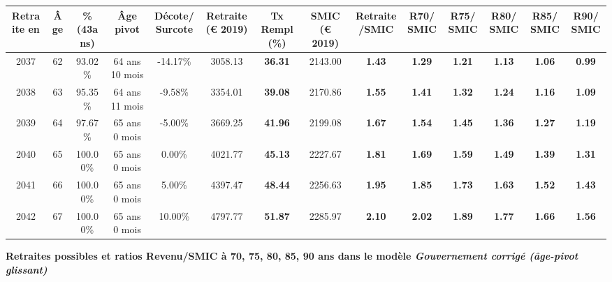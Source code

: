 \begin{adjustbox}{max width=\textwidth} 
\begin{tabular}[htb]{|c|c||c|c|c||c|c||c|c||c|c|c|c|c|} 
\hline 
 Retraite en &  Âge &  \%(43ans) &  Âge pivot &  Décote/Surcote &  Retraite (\euro{} 2019) &  Tx Rempl(\%) &  SMIC (\euro{} 2019) &  Retraite/SMIC &  R70/SMIC &  R75/SMIC &  R80/SMIC &  R85/SMIC &  R90/SMIC \\ 
\hline \hline 
 2037 &  62 &  93.02\% &  64 ans 10 mois &  -14.17\% &  3058.13 &  {\bf 36.31} &  2143.00 &  {\bf 1.43} &  {\bf 1.29} &  {\bf 1.21} &  {\bf 1.13} &  {\bf 1.06} &  {\bf {\color{red} 0.99}} \\ 
\hline 
 2038 &  63 &  95.35\% &  64 ans 11 mois &  -9.58\% &  3354.01 &  {\bf 39.08} &  2170.86 &  {\bf 1.55} &  {\bf 1.41} &  {\bf 1.32} &  {\bf 1.24} &  {\bf 1.16} &  {\bf 1.09} \\ 
\hline 
 2039 &  64 &  97.67\% &  65 ans 0 mois &  -5.00\% &  3669.25 &  {\bf 41.96} &  2199.08 &  {\bf 1.67} &  {\bf 1.54} &  {\bf 1.45} &  {\bf 1.36} &  {\bf 1.27} &  {\bf 1.19} \\ 
\hline 
 2040 &  65 &  100.00\% &  65 ans 0 mois &  0.00\% &  4021.77 &  {\bf 45.13} &  2227.67 &  {\bf 1.81} &  {\bf 1.69} &  {\bf 1.59} &  {\bf 1.49} &  {\bf 1.39} &  {\bf 1.31} \\ 
\hline 
 2041 &  66 &  100.00\% &  65 ans 0 mois &  5.00\% &  4397.47 &  {\bf 48.44} &  2256.63 &  {\bf 1.95} &  {\bf 1.85} &  {\bf 1.73} &  {\bf 1.63} &  {\bf 1.52} &  {\bf 1.43} \\ 
\hline 
 2042 &  67 &  100.00\% &  65 ans 0 mois &  10.00\% &  4797.77 &  {\bf 51.87} &  2285.97 &  {\bf 2.10} &  {\bf 2.02} &  {\bf 1.89} &  {\bf 1.77} &  {\bf 1.66} &  {\bf 1.56} \\ 
\hline 
\hline 
\end{tabular} 
\end{adjustbox} 
 
 \vspace{0.1cm} 
{\bf \noindent Retraites possibles et ratios Revenu/SMIC à 70, 75, 80, 85, 90 ans dans le modèle \emph{Gouvernement corrigé (âge-pivot glissant)}}  
 
